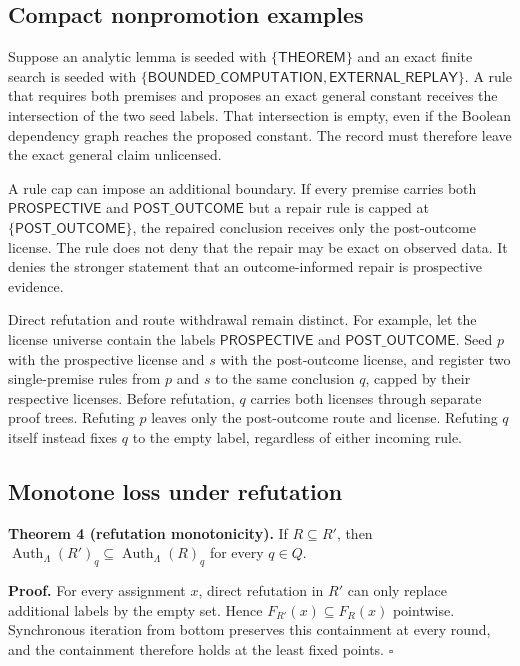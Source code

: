 \documentclass[pdflatex,sn-mathphys-num]{sn-jnl}
\begin{document}
\subsection{Compact nonpromotion examples}\label{compact-nonpromotion-examples}

Suppose an analytic lemma is seeded with \(\{\textsf{THEOREM}\}\) and an exact finite search is seeded with \(\{\textsf{BOUNDED\_COMPUTATION},\textsf{EXTERNAL\_REPLAY}\}\). A rule that requires both premises and proposes an exact general constant receives the intersection of the two seed labels. That intersection is empty, even if the Boolean dependency graph reaches the proposed constant. The record must therefore leave the exact general claim unlicensed.

A rule cap can impose an additional boundary. If every premise carries both \(\textsf{PROSPECTIVE}\) and \(\textsf{POST\_OUTCOME}\) but a repair rule is capped at \(\{\textsf{POST\_OUTCOME}\}\), the repaired conclusion receives only the post-outcome license. The rule does not deny that the repair may be exact on observed data. It denies the stronger statement that an outcome-informed repair is prospective evidence.

Direct refutation and route withdrawal remain distinct. For example, let the license universe contain the labels \(\textsf{PROSPECTIVE}\) and \(\textsf{POST\_OUTCOME}\). Seed \(p\) with the prospective license and \(s\) with the post-outcome license, and register two single-premise rules from \(p\) and \(s\) to the same conclusion \(q\), capped by their respective licenses. Before refutation, \(q\) carries both licenses through separate proof trees. Refuting \(p\) leaves only the post-outcome route and license. Refuting \(q\) itself instead fixes \(q\) to the empty label, regardless of either incoming rule.

\subsection{Monotone loss under refutation}\label{monotone-loss-under-refutation}

\textbf{Theorem 4 (refutation monotonicity).} If \(R\subseteq R'\), then \(\operatorname{Auth}_\Lambda(R')_q\subseteq\operatorname{Auth}_\Lambda(R)_q\) for every \(q\in Q\).

\textbf{Proof.} For every assignment \(x\), direct refutation in \(R'\) can only replace additional labels by the empty set. Hence \(F_{R'}(x)\subseteq F_R(x)\) pointwise. Synchronous iteration from bottom preserves this containment at every round, and the containment therefore holds at the least fixed points. \(\square\)
\end{document}
